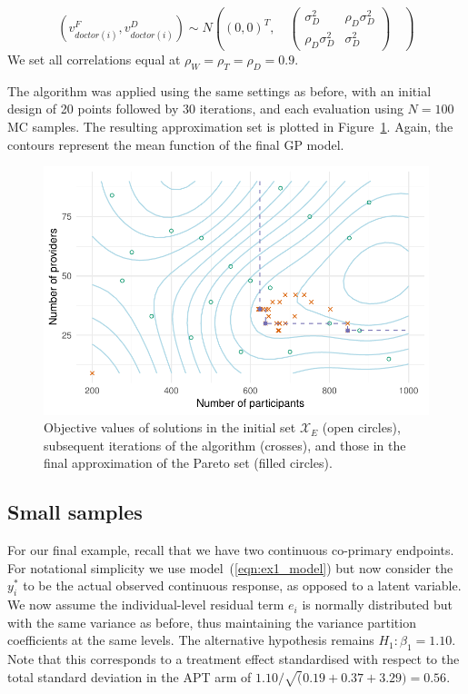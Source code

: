 \documentclass{article} %
\begin{document}
$$
(v_{doctor(i)}^F, v_{doctor(i)}^D) \sim N\left( (0,0)^T, \quad
\begin{pmatrix} 
\sigma_D^2  & \rho_D \sigma_D^2  \\
\rho_D \sigma_D^2  & \sigma_D^2 
\end{pmatrix}
\quad \right)
$$
We set all correlations equal at $\rho_W = \rho_T = \rho_D = 0.9$.

The algorithm was applied using the same settings as before, with an initial design of 20 points followed by 30 iterations, and each evaluation using $N = 100$ MC samples. The resulting approximation set is plotted in Figure~\ref{fig:ex2_single_run}. Again, the contours represent the mean function of the final GP model.

\begin{figure}
\centering
\includegraphics[scale=0.8]{./Figures/ex2_single_run}
\caption{Objective values of solutions in the initial set $\mathcal{X}_{E}$ (open circles), subsequent iterations of the algorithm (crosses), and those in the final approximation of the Pareto set (filled circles).}
\label{fig:ex2_single_run}
\end{figure}

\subsection{Small samples}

For our final example, recall that we have two continuous co-primary endpoints. For notational simplicity we use model~(\ref{eqn:ex1_model}) but now consider the $y_i^*$ to be the actual observed continuous response, as opposed to a latent variable. We now assume the individual-level residual term $e_i$ is normally distributed but with the same variance as before, thus maintaining the variance partition coefficients at the same levels. The alternative hypothesis remains $H_1: \beta_1 = 1.10$. Note that this corresponds to a treatment effect standardised with respect to the total standard deviation in the APT arm of $1.10/\sqrt(0.19+0.37+3.29) = 0.56$.
\end{document}

